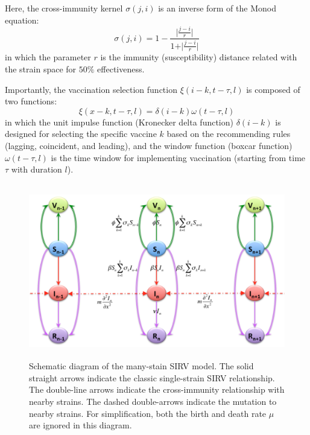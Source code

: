 \documentclass[preprint,12pt]{elsarticle}
\begin{document}
Here, the cross-immunity kernel \(\sigma(j,i)\) is an inverse form of the Monod equation:
\begin{equation}
  \label{eq:Immunity}
  \sigma(j,i) = 1 - \frac{\vert {\frac{j-i}{r}} \vert}{1 + \vert {\frac{j-i}{r}} \vert}
\end{equation}
in which the parameter \(r\) is the immunity (susceptibility) distance related with the strain space for \(50\%\) effectiveness. 

Importantly, the vaccination selection function \(\xi(i-k, t-\tau, l)\) is composed of two functions: 
\begin{equation}
  \label{eq:Selection}
  \xi(x-k, t-\tau, l) =  \delta(i-k) \omega(t-\tau, l)
\end{equation}
in which the unit impulse function (Kronecker delta function) \(\delta(i-k)\) is designed for selecting the specific vaccine \(k\) based on the recommending rules (lagging, coincident, and leading), and the window function (boxcar function) \(\omega(t-\tau, l)\) is the time window for implementing vaccination (starting from time \(\tau\) with duration \(l\)).


\newpage
\begin{figure}
  \centering
  \includegraphics[width=6in,height=3in]{figures/Diagram}
  \caption{Schematic diagram of the many-stain SIRV model.
  The solid straight arrows indicate the classic single-strain SIRV relationship.
  The double-line arrows indicate the cross-immunity relationship with nearby strains.
  The dashed double-arrows indicate the mutation to nearby strains. For simplification, both the birth and death rate \(\mu\) are ignored in this diagram.}
\label{fig:Diagram}
\end{figure}
\end{document}
